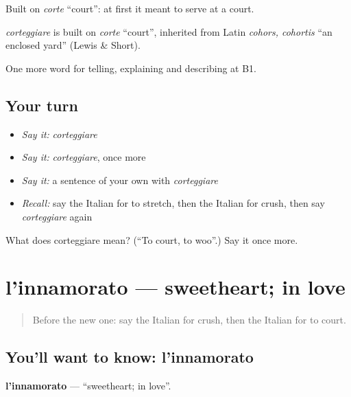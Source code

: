Built on \emph{corte} \textquotedblleft{}court\textquotedblright{}: at first it meant to serve at a court.

\begin{cousinweb}
\emph{corteggiare} is built on \emph{corte} \textquotedblleft{}court\textquotedblright{}, inherited from Latin \emph{cohors, cohortis} \textquotedblleft{}an enclosed yard\textquotedblright{} (Lewis \& Short).
\end{cousinweb}

\begin{grammarlens}[title={What you've built}]
One more word for telling, explaining and describing at B1.
\end{grammarlens}

\subsection*{Your turn}
\begin{itemize}
\raggedright
  \item \emph{Say it:} \emph{corteggiare}
  \item \emph{Say it:} \emph{corteggiare}, once more
  \item \emph{Say it:} a sentence of your own with \emph{corteggiare}
  \item \emph{Recall:} say the Italian for to stretch, then the Italian for crush, then say \emph{corteggiare} again
\end{itemize}

\begin{tcolorbox}[breakable,colback=teal!4,colframe=teal!35!black,title={Before you move on}]
What does corteggiare mean? (\textquotedblleft{}To court, to woo\textquotedblright{}.) Say it once more.
\end{tcolorbox}
\section[l'innamorato]{l'innamorato — sweetheart; in love}

\label{lesson:IT-C491-innamorato}



\begin{quote}
Before the new one: say the Italian for crush, then the Italian for to court.
\end{quote}

\subsection*{You'll want to know: l'innamorato}
\textbf{l'innamorato} — \textquotedblleft{}sweetheart; in love\textquotedblright{}.

